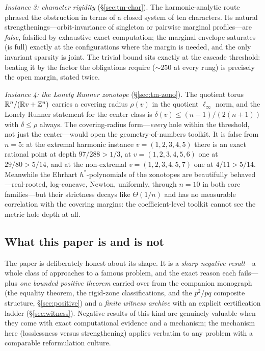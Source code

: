 \emph{Instance 3: character rigidity} (\S\ref{sec:tm-char}). The
harmonic-analytic route phrased the obstruction in terms of a closed
system of ten characters. Its natural strengthenings---orbit-invariance
of singleton or pairwise marginal profiles---are \emph{false}, falsified
by exhaustive exact computation; the marginal envelope saturates (is
full) exactly at the configurations where the margin is needed, and the
only invariant sparsity is joint. The trivial bound sits exactly at the
cascade threshold: beating it by the factor the obligations require
($\sim\!250$ at every rung) is precisely the open margin, stated twice.

\emph{Instance 4: the Lonely Runner zonotope}
(\S\ref{sec:tm-zono}). The quotient torus $\mathbb{R}^n/(\mathbb{R} v+\mathbb{Z}^n)$ carries a
covering radius $\rho(v)$ in the quotient $\ell_\infty$ norm, and the
Lonely Runner statement for the center class is
$\delta(v)\le (n{-}1)/(2(n{+}1))$ with $\delta\le\rho$ always. The
covering-radius form---\emph{every} hole within the threshold, not just
the center---would open the geometry-of-numbers toolkit. It is false from
$n=5$: at the extremal harmonic instance $v=(1,2,3,4,5)$ there is an
exact rational point at depth $97/288>1/3$, at $v=(1,2,3,4,5,6)$ one at
$29/80>5/14$, and at the non-extremal $v=(1,2,3,4,5,7)$ one at
$4/11>5/14$. Meanwhile the Ehrhart $h^*$-polynomials of the zonotopes
are beautifully behaved---real-rooted, log-concave, Newton, uniformly,
through $n=10$ in both core families---but their strictness decays like
$\Theta(1/n)$ and has no measurable correlation with the covering
margins: the coefficient-level toolkit cannot see the metric hole depth
at all.

\subsection{What this paper is and is not}

The paper is deliberately honest about its shape. It is a \emph{sharp
negative result}---a whole class of approaches to a famous problem, and
the exact reason each fails---plus \emph{one bounded positive theorem}
carried over from the companion monograph (the equality theorem, the
rigid-zone classifications, and the $p^2$/$pq$ composite structure,
\S\ref{sec:positive}) and a \emph{finite witness archive} with an explicit
certification ladder (\S\ref{sec:witness}). Negative results of this kind
are genuinely valuable when they come with exact computational evidence
and a mechanism; the mechanism here (losslessness versus strengthening)
applies verbatim to any problem with a comparable reformulation culture.

